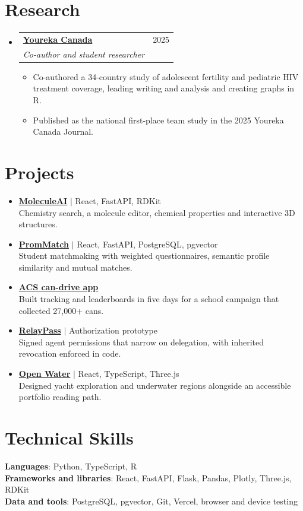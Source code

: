 \documentclass[letterpaper,11pt]{article}
\makeatletter
\newcommand{\resumeItem}[1]{
  \item\small{
    {#1 \vspace{-2pt}}
  }
}
\newcommand{\resumeSubheading}[4]{
  \vspace{-2pt}\item
    \begin{tabular*}{0.97\textwidth}[t]{l@{\extracolsep{\fill}}r}
      \textbf{#1} & #2 \\
      \textit{\small#3} & \textit{\small #4} \\
    \end{tabular*}\vspace{-7pt}
}
\newcommand{\resumeSubHeadingListStart}{\begin{itemize}[leftmargin=0.15in, label={}]}
\newcommand{\resumeSubHeadingListEnd}{\end{itemize}}
\newcommand{\resumeItemListStart}{\begin{itemize}}
\newcommand{\resumeItemListEnd}{\end{itemize}\vspace{-5pt}}
\makeatother
\begin{document}
\section{Research}
\resumeSubHeadingListStart
\resumeSubheading{\href{https://yourekacanada.org/youreka-journal-2025}{Youreka Canada}}{2025}{Co-author and student researcher}{}
\resumeItemListStart
\resumeItem{Co-authored a 34-country study of adolescent fertility and pediatric HIV treatment coverage, leading writing and analysis and creating graphs in R.}
\resumeItem{Published as the national first-place team study in the 2025 Youreka Canada Journal.}
\resumeItemListEnd
\resumeSubHeadingListEnd
\section{Projects}
\resumeSubHeadingListStart
\item\small{\textbf{\href{https://github.com/tejask-dev/OrganicChem-WebApp}{MoleculeAI}} $|$ React, FastAPI, RDKit \\ Chemistry search, a molecule editor, chemical properties and interactive 3D structures.}\vspace{-4pt}
\item\small{\textbf{\href{https://github.com/tejask-dev/PromMatch}{PromMatch}} $|$ React, FastAPI, PostgreSQL, pgvector \\ Student matchmaking with weighted questionnaires, semantic profile similarity and mutual matches.}\vspace{-4pt}
\item\small{\textbf{\href{https://github.com/tejask-dev/ACS\_CanDrive-WebApp}{ACS can-drive app}} \\ Built tracking and leaderboards in five days for a school campaign that collected 27,000+ cans.}\vspace{-4pt}
\item\small{\textbf{\href{https://github.com/tejask-dev/Egoist-Ideathon---RelayPass}{RelayPass}} $|$ Authorization prototype \\ Signed agent permissions that narrow on delegation, with inherited revocation enforced in code.}\vspace{-4pt}
\item\small{\textbf{\href{https://github.com/tejask-dev/personal-portfolio}{Open Water}} $|$ React, TypeScript, Three.js \\ Designed yacht exploration and underwater regions alongside an accessible portfolio reading path.}\vspace{-4pt}
\resumeSubHeadingListEnd
\section{Technical Skills}
\begin{itemize}[leftmargin=0.15in, label={}]
\small{\item{\textbf{Languages}: Python, TypeScript, R \\
\textbf{Frameworks and libraries}: React, FastAPI, Flask, Pandas, Plotly, Three.js, RDKit \\
\textbf{Data and tools}: PostgreSQL, pgvector, Git, Vercel, browser and device testing}}
\end{itemize}
\end{document}
